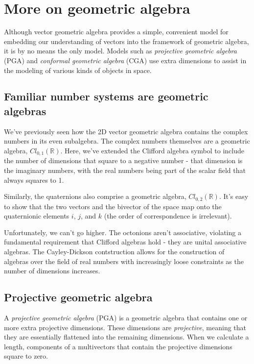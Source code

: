 \chapter{More on geometric algebra}

Although vector geometric algebra provides a simple, convenient model for embedding our
understanding of vectors into the framework of geometric algebra, it is by no means the only model.
Models such as \textit{projective geometric algebra} (PGA) and \textit{conformal geometric algebra}
(CGA) use extra dimensions to assist in the modeling of various kinds of objects in space.

\section{Familiar number systems are geometric algebras}

We've previously seen how the 2D vector geometric algebra contains the complex numbers in its even
subalgebra. The complex numbers themselves are a geometric algebra, $Cl_{0,1}(\mathbb{R})$. Here,
we've extended the Clifford algebra symbol to include the number of dimensions that square to a
negative number - that dimension is the imaginary numbers, with the real numbers being part of the
scalar field that always squares to 1.

Similarly, the quaternions also comprise a geometric algebra, $Cl_{0,2}(\mathbb{R})$. It's easy to 
show that the two vectors and the bivector of the space map onto the quaternionic elements $i$, $j$,
and $k$ (the order of correspondence is irrelevant).

Unfortunately, we can't go higher. The octonions aren't associative, violating a fundamental
requirement that Clifford algebras hold - they are unital associative algebras. The Cayley-Dickson
contstruction allows for the construction of algebras over the field of real numbers with
increasingly loose constraints as the number of dimensions increases.

\section{Projective geometric algebra}

A \textit{projective geometric algebra} (PGA) is a geometric algebra that contains one or more extra
projective dimensions. These dimensions are \textit{projective}, meaning that they are essentially
flattened into the remaining dimensions. When we calculate a length, components of a multivectors
that contain the projective dimensions square to zero.


